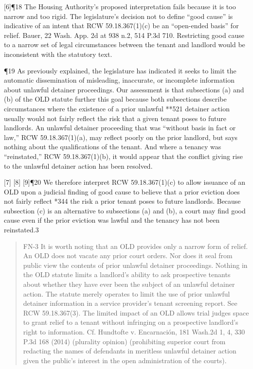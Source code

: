 \documentclass[11pt]{article}
\begin{document}
[6]¶18 The Housing Authority’s proposed interpretation fails because it is too narrow and too rigid. The legislature’s decision not to define “good cause” is indicative of an intent that RCW 59.18.367(1)(c) be an “open-ended basis” for relief. Bauer, 22 Wash. App. 2d at 938 n.2, 514 P.3d 710. Restricting good cause to a narrow set of legal circumstances between the tenant and landlord would be inconsistent with the statutory text.

¶19 As previously explained, the legislature has indicated it seeks to limit the automatic dissemination of misleading, inaccurate, or incomplete information about unlawful detainer proceedings. Our assessment is that subsections (a) and (b) of the OLD statute further this goal because both subsections describe circumstances where the existence of a prior unlawful **521 detainer action usually would not fairly reflect the risk that a given tenant poses to future landlords. An unlawful detainer proceeding that was “without basis in fact or law,” RCW 59.18.367(1)(a), may reflect poorly on the prior landlord, but says nothing about the qualifications of the tenant. And where a tenancy was “reinstated,” RCW 59.18.367(1)(b), it would appear that the conflict giving rise to the unlawful detainer action has been resolved.

[7] [8] [9]¶20 We therefore interpret RCW 59.18.367(1)(c) to allow issuance of an OLD upon a judicial finding of good cause to believe that a prior eviction does not fairly reflect *344 the risk a prior tenant poses to future landlords. Because subsection (c) is an alternative to subsections (a) and (b), a court may find good cause even if the prior eviction was lawful and the tenancy has not been reinstated.3

\begin{quote}
FN-3 It is worth noting that an OLD provides only a narrow form of relief. An OLD does not vacate any prior court orders. Nor does it seal from public view the contents of prior unlawful detainer proceedings. Nothing in the OLD statute limits a landlord’s ability to ask prospective tenants about whether they have ever been the subject of an unlawful detainer action. The statute merely operates to limit the use of prior unlawful detainer information in a service provider’s tenant screening report. See RCW 59.18.367(3). The limited impact of an OLD allows trial judges space to grant relief to a tenant without infringing on a prospective landlord’s right to information. Cf. Hundtofte v. Encarnación, 181 Wash.2d 1, 4, 330 P.3d 168 (2014) (plurality opinion) (prohibiting superior court from redacting the names of defendants in meritless unlawful detainer action given the public’s interest in the open administration of the courts).
\end{quote}
\end{document}
